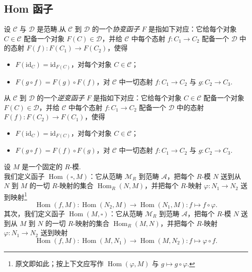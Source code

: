 \subsection{Hom 函子}

\begin{definition}\label{c4-def-1-9}
设 $\mathscr C$ 与 $\mathscr D$ 是范畴.从 $\mathscr C$ 到 $\mathscr D$ 的一个\emph{协变函子} $F$ 是指如下对应：它给每个对象 $C\in\mathscr C$ 配备一个对象 $F(C)\in\mathscr D$，并给 $\mathscr C$ 中每个态射 $f:C_1\to C_2$ 配备一个 $\mathscr D$ 中的态射 $F(f):F(C_1)\to F(C_2)$，使得
\begin{itemize}
    \item $F(\mathrm{id}_C)=\mathrm{id}_{F(C)}$，对每个对象 $C\in\mathscr C$；
    \item $F(g\circ f)=F(g)\circ F(f)$，对 $\mathscr C$ 中一切态射 $f:C_1\to C_2$ 与 $g:C_2\to C_3$.
\end{itemize}
从 $\mathscr C$ 到 $\mathscr D$ 的一个\emph{逆变函子} $F$ 是指如下对应：它给每个对象 $C\in\mathscr C$ 配备一个对象 $F(C)\in\mathscr D$，并给 $\mathscr C$ 中每个态射 $f:C_1\to C_2$ 配备一个 $\mathscr D$ 中的态射 $F(f):F(C_2)\to F(C_1)$，使得
\begin{itemize}
    \item $F(\mathrm{id}_C)=\mathrm{id}_{F(C)}$，对每个对象 $C\in\mathscr C$；
    \item $F(g\circ f)=F(f)\circ F(g)$，对 $\mathscr C$ 中一切态射 $f:C_1\to C_2$ 与 $g:C_2\to C_3$.
\end{itemize}
\end{definition}

\begin{definition}\label{c4-def-1-10}
设 $M$ 是一个固定的 $R$-模.\\
我们定义函子 $\operatorname{Hom}(\square, M)$：它从范畴 $\mathscr{M}_R$ 到范畴 $\mathscr A$，把每个 $R$-模 $N$ 送到从 $N$ 到 $M$ 的一切 $R$-映射的集合 $\operatorname{Hom}_R(N, M)$，并把每个 $R$-映射 $\varphi:N_1\to N_2$ 送到映射\footnote{原文即如此；按上下文应写作 $\operatorname{Hom}(\varphi, M)$ 与 $g\mapsto g\circ\varphi$.}
\[
\operatorname{Hom}(f, M):\operatorname{Hom}(N_2, M)\to\operatorname{Hom}(N_1, M):f\mapsto f\circ\varphi.
\]
其次，我们定义函子 $\operatorname{Hom}(M, \square)$：它从范畴 $\mathscr{M}_R$ 到范畴 $\mathscr A$，把每个 $R$-模 $N$ 送到从 $M$ 到 $N$ 的一切 $R$-映射的集合 $\operatorname{Hom}_R(M, N)$，并把每个 $R$-映射 $\varphi:N_1\to N_2$ 送到映射
\[
\operatorname{Hom}(f, M):\operatorname{Hom}(M, N_1)\to\operatorname{Hom}(M, N_2):f\mapsto\varphi\circ f.
\]
\end{definition}

